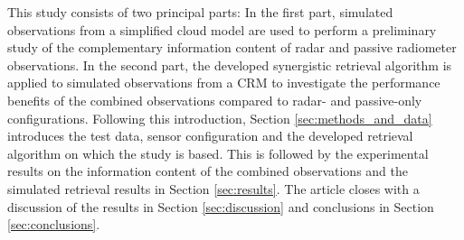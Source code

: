 \documentclass[journal abbreviation, manuscript]{copernicus}
\begin{document}
%

This study consists of two principal parts: In the first part, simulated
observations from a simplified cloud model are used to perform a preliminary
study of the complementary information content of radar and passive radiometer
observations. In the second part, the developed synergistic retrieval algorithm
is applied to simulated observations from a CRM to investigate the performance
benefits of the combined observations compared to radar- and passive-only
configurations. Following this introduction, Section \ref{sec:methods_and_data}
introduces the test data, sensor configuration and the developed retrieval
algorithm on which the study is based. This is followed by the experimental
results on the information content of the combined observations and the
simulated retrieval results in Section \ref{sec:results}. The article closes
with a discussion of the results in Section \ref{sec:discussion} and conclusions
in Section \ref{sec:conclusions}.
\end{document}
